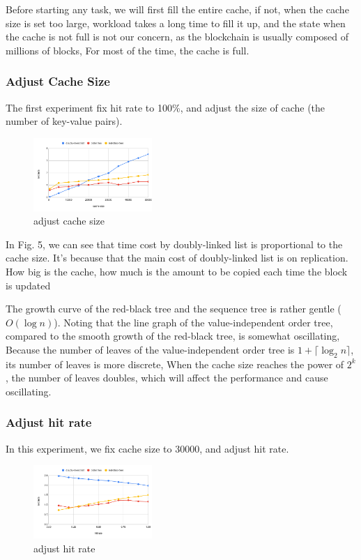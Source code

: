\documentclass[conference]{IEEEtran}
\begin{document}
Before starting any task, we will first fill
the entire cache, if not, when the cache size is set too large,
workload takes a long time to fill it up,
and the state when the cache is not full is not our concern,
as the blockchain is usually composed of millions of blocks,
For most of the time, the cache is full.

\subsubsection{Adjust Cache Size}

The first experiment fix hit rate to 100\%,
and adjust the size of cache (the number of key-value pairs).

\begin{figure}
  \centering
  \includegraphics[width=0.4\textwidth]{adjust_cache_size.png}
  \caption{adjust cache size}
\end{figure}

In Fig. 5, we can see that time cost by doubly-linked list
is proportional to the cache size. It's because that
the main cost of doubly-linked list is on replication.
How big is the cache, how much is the amount to be copied each time the block is updated

The growth curve of the red-black tree and the sequence
tree is rather gentle ($O(\log n)$).
Noting that the line graph of the value-independent order tree,
compared to the smooth growth of the red-black tree,
is somewhat oscillating,
Because the number of leaves of the
value-independent order tree is $1 + \lceil \log_2 n \rceil$,
its number of leaves is more discrete,
When the cache size reaches the power of $2^k$,
the number of leaves doubles, which will affect
the performance and cause oscillating.

\subsubsection{Adjust hit rate}

In this experiment, we fix cache size to 30000, and adjust hit rate.

\begin{figure}
  \centering
  \includegraphics[width=0.4\textwidth]{adjust_hit_rate.png}
  \caption{adjust hit rate}
\end{figure}
\end{document}
